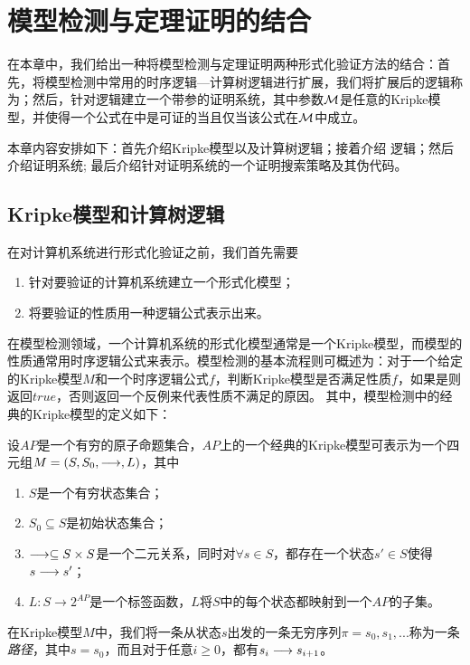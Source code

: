 \chapter{模型检测与定理证明的结合}\label{chapt:sctl}
在本章中，我们给出一种将模型检测与定理证明两种形式化验证方法的结合：首先，将模型检测中常用的时序逻辑---计算树逻辑\CTL{}进行扩展，我们将扩展后的逻辑称为\CTLP{}；然后，针对\CTLP{}逻辑建立一个带参的证明系统\sctlm{}，其中参数$\cal M$是任意的Kripke模型，并使得一个\CTLP{}公式在\sctlm{}中是可证的当且仅当该公式在$\cal M$中成立。

本章内容安排如下：首先介绍Kripke模型以及计算树逻辑\CTL{}；接着介绍\CTLP{} 逻辑；然后介绍证明系统\SCTL{}; 最后介绍针对证明系统\SCTL{}的一个证明搜索策略及其伪代码。

\section{Kripke模型和计算树逻辑\CTL{}}
在对计算机系统进行形式化验证之前，我们首先需要
\begin{enumerate}
	\item 针对要验证的计算机系统建立一个形式化模型；
	\item 将要验证的性质用一种逻辑公式表示出来。
\end{enumerate}
在模型检测领域，一个计算机系统的形式化模型通常是一个Kripke模型，而模型的性质通常用时序逻辑公式来表示。模型检测的基本流程则可概述为：对于一个给定的Kripke模型$M$和一个时序逻辑公式$f$，判断Kripke模型是否满足性质$f$，如果是则返回$true$，否则返回一个反例来代表性质不满足的原因。
其中，模型检测中的经典的Kripke模型的定义如下：
\begin{definition}[经典的Kripke模型]
	设$AP$是一个有穷的原子命题集合，$AP$上的一个经典的Kripke模型可表示为一个四元组$M=(S,S_0,\longrightarrow,L)$，其中
	\begin{enumerate}
		\item $S$是一个有穷状态集合；
		\item $S_0\subseteq S$是初始状态集合；
		\item $\longrightarrow\subseteq S\times S$是一个二元关系，同时对$\forall s\in S$，都存在一个状态$s'\in S$使得$s\longrightarrow s'$；
		\item $L:S\rightarrow 2^{AP}$是一个标签函数，$L$将$S$中的每个状态都映射到一个$AP$的子集。
	\end{enumerate}
\end{definition}
在Kripke模型$M$中，我们将一条从状态$s$出发的一条无穷序列$\pi=s_0,s_1,...$称为一条\textit{路径}，其中$s=s_0$，而且对于任意$i\ge 0$，都有$s_i\longrightarrow s_{i+1}$。

